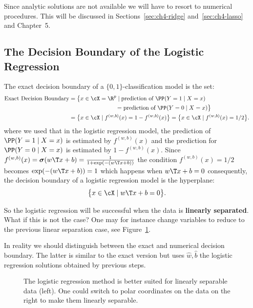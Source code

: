 Since analytic solutions are not available we will have to resort to numerical
procedures. This will be discussed in Sections~\ref{sec:ch4-ridge} and~\ref{sec:ch4-lasso} and Chapter~5.

\subsection{The Decision Boundary of the Logistic Regression}

The exact decision boundary of a $\{0, 1\}$-classification model is the set:
\begin{align}
\text{Exact Decision Boundary} &= \bigl\{ x \in \cX = \R^p \mid \text{prediction of } \PP(Y = 1 \mid X = x) \nonumber\\
&\qquad\qquad\qquad\qquad = \text{prediction of } \PP(Y = 0 \mid X = x) \bigr\} \nonumber\\
&= \bigl\{ x \in \cX \mid f^{(w,b)}(x) = 1 - f^{(w,b)}(x) \bigr\} = \bigl\{ x \in \cX \mid f^{(w,b)}(x) = 1/2 \bigr\}. \label{eq:ch4-decision-boundary}
\end{align}
where we used that in the logistic regression model, the prediction of $\PP(Y = 1 \mid X = x)$
is estimated by $f^{(w,b)}(x)$ and the prediction for $\PP(Y = 0 \mid X = x)$
is estimated by $1 - f^{(w,b)}(x)$. Since $f^{(w,b)}(x) = \boldsymbol{\sigma}(w\T x + b) = \frac{1}{1 + \exp(-(w\T x + b))}$
the condition $f^{(w,b)}(x) = 1/2$ becomes $\exp(-(w\T x + b)) = 1$ which happens
when $w\T x + b = 0$ consequently, the decision boundary of a logistic regression
model is the hyperplane:
\begin{equation}\label{eq:ch4-hyperplane}
\bigl\{ x \in \cX \mid w\T x + b = 0 \bigr\}.
\end{equation}

So the logistic regression will be successful when the data is \textbf{linearly separated}.
What if this is not the case? One may for instance change variables to reduce
to the previous linear separation case, see Figure~\ref{fig:ch4-decision-bound}.

\begin{remark}
In reality we should distinguish between the exact and numerical decision boundary. The latter is similar to the exact version but
uses $\widehat{w}, \widehat{b}$ the logistic regression solutions obtained by previous steps.
\end{remark}

\begin{figure}[h]\centering
\caption{The logistic regression method is better suited for linearly separable data (left). One could switch to polar coordinates on the data on the right to make them linearly separable.}\label{fig:ch4-decision-bound}
\end{figure}

